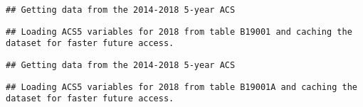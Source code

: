 \documentclass[]{article}
\newenvironment{Shaded}{\begin{snugshade}}{\end{snugshade}}
\newcommand{\DataTypeTok}[1]{\textcolor[rgb]{0.13,0.29,0.53}{#1}}
\newcommand{\DecValTok}[1]{\textcolor[rgb]{0.00,0.00,0.81}{#1}}
\newcommand{\KeywordTok}[1]{\textcolor[rgb]{0.13,0.29,0.53}{\textbf{#1}}}
\newcommand{\NormalTok}[1]{#1}
\newcommand{\OperatorTok}[1]{\textcolor[rgb]{0.81,0.36,0.00}{\textbf{#1}}}
\newcommand{\OtherTok}[1]{\textcolor[rgb]{0.56,0.35,0.01}{#1}}
\newcommand{\StringTok}[1]{\textcolor[rgb]{0.31,0.60,0.02}{#1}}
\begin{document}
\begin{verbatim}
## Getting data from the 2014-2018 5-year ACS
\end{verbatim}

\begin{verbatim}
## Loading ACS5 variables for 2018 from table B19001 and caching the dataset for faster future access.
\end{verbatim}

\begin{Shaded}
\end{Shaded}

\begin{verbatim}
## Getting data from the 2014-2018 5-year ACS
\end{verbatim}

\begin{verbatim}
## Loading ACS5 variables for 2018 from table B19001A and caching the dataset for faster future access.
\end{verbatim}

\begin{Shaded}
\end{Shaded}
\end{document}
